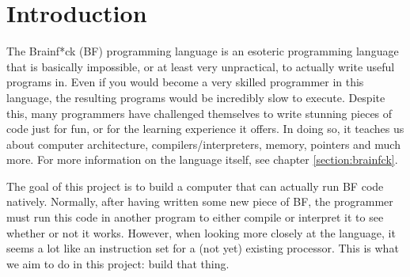 \section{Introduction}
The Brainf*ck (BF) programming language is an esoteric programming language that is basically impossible, or at least very unpractical, to actually write useful programs in. Even if you would become a very skilled programmer in this language, the resulting programs would be incredibly slow to execute. Despite this, many programmers have challenged themselves to write stunning pieces of code just for fun, or for the learning experience it offers. In doing so, it teaches us about computer architecture, compilers/interpreters, memory, pointers and much more. For more information on the language itself, see chapter \ref{section:brainfck}.

The goal of this project is to build a computer that can actually run BF code natively. Normally, after having written some new piece of BF, the programmer must run this code in another program to either compile or interpret it to see whether or not it works. However, when looking more closely at the language, it seems a lot like an instruction set for a (not yet) existing processor. This is what we aim to do in this project: build that thing.



